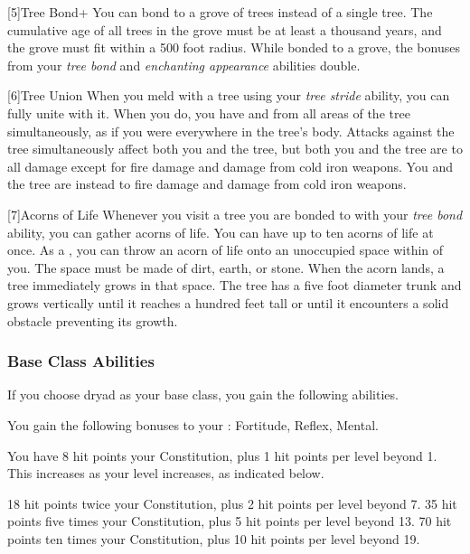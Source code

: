             [5]{Tree Bond+} You can bond to a grove of trees instead of a single tree.
            The cumulative age of all trees in the grove must be at least a thousand years, and the grove must fit within a 500 foot radius.
            While bonded to a grove, the bonuses from your \textit{tree bond} and \textit{enchanting appearance} abilities double.

            [6]{Tree Union} When you meld with a tree using your \textit{tree stride} ability, you can fully unite with it.
            When you do, you have  and  from all areas of the tree simultaneously, as if you were everywhere in the tree's body.
            Attacks against the tree simultaneously affect both you and the tree, but both you and the tree are \impervious to all damage except for fire damage and damage from cold iron weapons.
            You and the tree are instead \vulnerable to fire damage and damage from cold iron weapons.

            [7]{Acorns of Life} Whenever you visit a tree you are bonded to with your \textit{tree bond} ability, you can gather acorns of life.
            You can have up to ten acorns of life at once.
            As a , you can throw an acorn of life onto an unoccupied  space within \medrange of you.
            The space must be made of dirt, earth, or stone.
            When the acorn lands, a tree immediately grows in that space.
            The tree has a five foot diameter trunk and grows vertically until it reaches a hundred feet tall or until it encounters a solid obstacle preventing its growth.

        \subsubsection{Base Class Abilities}
            If you choose dryad as your base class, you gain the following abilities.

            You gain the following bonuses to your :  Fortitude,  Reflex,  Mental.

                You have 8 hit points \add  your Constitution, plus 1 hit points per level beyond 1.
                This increases as your level increases, as indicated below.
                \begin{itemize}
                     18 hit points \add twice your Constitution, plus 2 hit points per level beyond 7.
                     35 hit points \add five times your Constitution, plus 5 hit points per level beyond 13.
                     70 hit points \add ten times your Constitution, plus 10 hit points per level beyond 19.
                \end{itemize}

